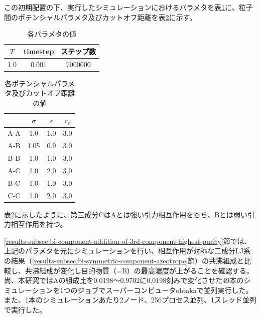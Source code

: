 \documentclass[titlepage]{jsreport}
\begin{document}
\newpage
この初期配置の下、実行したシミュレーションにおけるパラメタを表\ref{table:bi-component-addition-of-3rd-component-parameter}に、粒子間のポテンシャルパラメタ及びカットオフ距離を表\ref{table:bi-component-addition-of-3rd-component-potential-parameter}に示す。

\begin{table}[htbp]
    \begin{center}
        \caption{各パラメタの値}
        \label{table:bi-component-addition-of-3rd-component-parameter}
        \begin{tabular}{c c c}
            $T$ & timestep & ステップ数 \\
            \hline
            1.0 & 0.001 & 7000000 \\
        \end{tabular}
    \end{center}
\end{table}

\begin{table}[htbp]
    \begin{center}
        \caption{各ポテンシャルパラメタ及びカットオフ距離の値}
        \label{table:bi-component-addition-of-3rd-component-potential-parameter}
        \begin{tabular}{c c c c}
            & $\sigma$ & $\epsilon$ & $r_c$ \\
            \hline
            A-A & 1.0 & 1.0 & 3.0 \\
            A-B & 1.05 & 0.9 & 3.0 \\
            B-B & 1.0 & 1.0 & 3.0 \\
            A-C & 1.0 & 2.0 & 3.0 \\
            B-C & 1.0 & 1.0 & 3.0 \\
            C-C & 1.0 & 2.0 & 3.0
        \end{tabular}
    \end{center}
\end{table}

表\ref{table:bi-component-addition-of-3rd-component-potential-parameter}に示したように、第三成分CはAとは強い引力相互作用をもち、Bとは弱い引力相互作用を持つ。

\ref{results-subsec:bi-component-addition-of-3rd-component-highest-purity}節では、上記のパラメタを元にシミュレーションを行い、相互作用が対称な二成分LJ系の結果（\ref{results-subsec:bi-symmetric-component-azeotrope}節）の共沸組成と比較し、共沸組成が変化し目的物質（=B）の最高濃度が上がることを確認する。尚、本研究ではAの組成比を0.0198〜0.9702に0.0198刻みで変化させた49本のシミュレーションを1つのジョブでスーパーコンピュータohtakaで並列実行した。また、1本のシミュレーションあたり2ノード、256プロセス並列、1スレッド並列で実行した。
\end{document}
